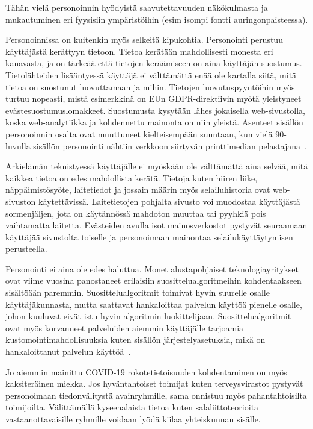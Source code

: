 \documentclass[finnish, 12pt, a4paper, elec, utf8, a-1b, online]{aaltothesis}
\begin{document}
Tähän vielä personoinnin hyödyistä saavutettavuuden näkökulmasta ja mukautuminen
eri fyysisiin ympäristöihin (esim isompi fontti auringonpaisteessa).

Personoinnissa on kuitenkin myös selkeitä kipukohtia. Personointi perustuu
käyttäjästä kerättyyn tietoon. Tietoa kerätään mahdollisesti monesta eri
kanavasta, ja on tärkeää että tietojen keräämiseen on aina käyttäjän suostumus.
Tietolähteiden lisääntyessä käyttäjä ei välttämättä enää ole kartalla siitä,
mitä tietoa on suostunut luovuttamaan ja mihin. Tietojen luovutuspyyntöihin myös
turtuu nopeasti, mistä esimerkkinä on EUn GDPR-direktiivin myötä yleistyneet
evästesuostumuslomakkeet. Suostumusta kysytään lähes jokaisella
web-sivustolla, koska web-analytiikka ja kohdennettu mainonta on niin
yleistä. Asenteet sisällön personoinnin osalta ovat muuttuneet kielteisempään
suuntaan, kun vielä 90-luvulla sisällön personointi nähtiin verkkoon siirtyvän
printtimedian pelastajana~\cite{adams_1995}.

Arkielämän teknistyessä käyttäjälle ei myöskään ole välttämättä aina selvää,
mitä kaikkea tietoa on edes mahdollista kerätä. Tietoja kuten hiiren liike,
näppäimistösyöte, laitetiedot ja jossain määrin myös selailuhistoria ovat
web-sivuston käytettävissä. Laitetietojen pohjalta sivusto voi muodostaa
käyttäjästä sormenjäljen, jota on käytännössä mahdoton muuttaa tai pyyhkiä pois
vaihtamatta laitetta. Evästeiden avulla isot mainosverkostot pystyvät seuraamaan
käyttäjää sivustolta toiselle ja personoimaan mainontaa selailukäyttäytymisen
perusteella.

Personointi ei aina ole edes haluttua. Monet alustapohjaiset teknologiayritykset
ovat viime vuosina panostaneet erilaisiin suosittelualgoritmeihin kohdentaakseen
sisältöään paremmin. Suosittelualgoritmit toimivat hyvin suurelle osalle
käyttäjäkunnasta, mutta saattavat hankaloittaa palvelun käyttöä pienelle osalle,
johon kuuluvat eivät istu hyvin algoritmin luokittelijaan. Suosittelualgoritmit
ovat myös korvanneet palveluiden aiemmin käyttäjälle tarjoamia
kustomointimahdollisuuksia kuten sisällön järjestelyasetuksia, mikä on
hankaloittanut palvelun käyttöä~\cite{patel_2022}.

Jo aiemmin mainittu COVID-19 rokotetietoisuuden kohdentaminen on myös
kaksiteräinen miekka. Jos hyväntahtoiset toimijat kuten terveysvirastot pystyvät
personoimaan tiedonvälitystä avainryhmille, sama onnistuu myös pahantahtoisilta
toimijoilta. Välittämällä kyseenalaista tietoa kuten salaliittoteorioita
vastaanottavaisille ryhmille voidaan lyödä kiilaa yhteiskunnan sisälle.
\end{document}

